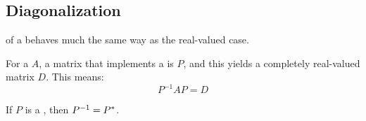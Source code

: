 \subsection{Diagonalization}\label{subsec:Complex_Matrix_Diagonalization}
 of a  behaves much the same way as the real-valued case.

For a  $A$, a matrix that implements a  is $P$, and this yields a completely real-valued matrix $D$.
This means:
\begin{equation*}
  P^{-1} A P = D
\end{equation*}

\begin{remark*}
  If $P$ is a , then $P^{-1} = P^{*}$.
\end{remark*}

